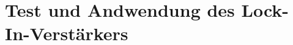 \section{Test und Andwendung des Lock-In-Verstärkers} %
\label{sec:Test_und_Andwendung_des_Lock-In-Verstärkers}

%

